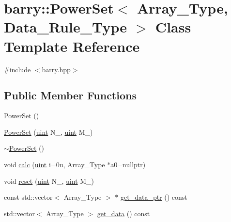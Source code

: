 \hypertarget{classbarry_1_1_power_set}{}\section{barry\+:\+:Power\+Set$<$ Array\+\_\+\+Type, Data\+\_\+\+Rule\+\_\+\+Type $>$ Class Template Reference}
\label{classbarry_1_1_power_set}


{\ttfamily \#include $<$barry.\+hpp$>$}

\subsection*{Public Member Functions}
\begin{DoxyCompactItemize}
\item 
\hyperlink{classbarry_1_1_power_set_ab2fa4e40323bb9225225bb52b86ff345}{Power\+Set} ()
\item 
\hyperlink{classbarry_1_1_power_set_a96a31964644ea81991fe103a2a8bfb1f}{Power\+Set} (\hyperlink{namespacebarry_a11dfc53ddb4672278319aa04f1e09a6c}{uint} N\+\_\+, \hyperlink{namespacebarry_a11dfc53ddb4672278319aa04f1e09a6c}{uint} M\+\_\+)
\item 
\hyperlink{classbarry_1_1_power_set_a3b9c1162ec54be631e1f01d085177b8d}{$\sim$\+Power\+Set} ()
\item 
void \hyperlink{classbarry_1_1_power_set_ab15a2b22478e72f351b8ac11392d22c6}{calc} (\hyperlink{namespacebarry_a11dfc53ddb4672278319aa04f1e09a6c}{uint} i=0u, Array\+\_\+\+Type $\ast$a0=nullptr)
\item 
void \hyperlink{classbarry_1_1_power_set_aba11dd8802cd2eb529c7c30b55994248}{reset} (\hyperlink{namespacebarry_a11dfc53ddb4672278319aa04f1e09a6c}{uint} N\+\_\+, \hyperlink{namespacebarry_a11dfc53ddb4672278319aa04f1e09a6c}{uint} M\+\_\+)
\item 
const std\+::vector$<$ Array\+\_\+\+Type $>$ $\ast$ \hyperlink{classbarry_1_1_power_set_a80b283b1ac115f1be049a09f1a69586a}{get\+\_\+data\+\_\+ptr} () const
\item 
std\+::vector$<$ Array\+\_\+\+Type $>$ \hyperlink{classbarry_1_1_power_set_a53ca37c9cb14abd6f61bc0127ac9d067}{get\+\_\+data} () const
\end{DoxyCompactItemize}
